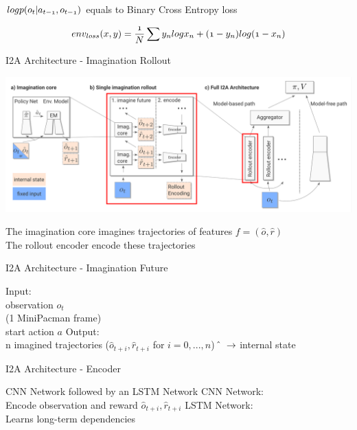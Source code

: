   $\mathnormal{log p(o_t | a_{t-1}, o_{t-1})}$ equals to Binary Cross Entropy loss
	
\begin{equation}
	\mathnormal{
	env_{loss}(x, y) = \frac{1}{N} \sum y_n log x_n + (1-y_n) log(1- x_n)
	}
	\end{equation}




I2A Architecture - Imagination Rollout


\includegraphics[width=\columnwidth]{./Images/i2a_all_imagination_rollout.png}%

The imagination core imagines trajectories of features $f = (\hat{o}, \hat{r})$\\
The rollout encoder encode these trajectories    



I2A Architecture - Imagination Future

Input:\\
		observation $o_t$ \\
		(1 MiniPacman frame)\\
		start action $a$
Output:\\
		n imagined trajectories ($\hat{o}_{t+i}, \hat{r}_{t+i}$ for $i = 0, ..., n$)
		 $\hat{} \hspace{2mm} \rightarrow$ internal state
	

I2A Architecture - Encoder

		 CNN Network followed by an LSTM Network
		CNN Network:\\
		Encode observation and reward $\hat{o}_{t+i}, \hat{r}_{t+i}$
		LSTM Network:\\
		Learns long-term dependencies
	
